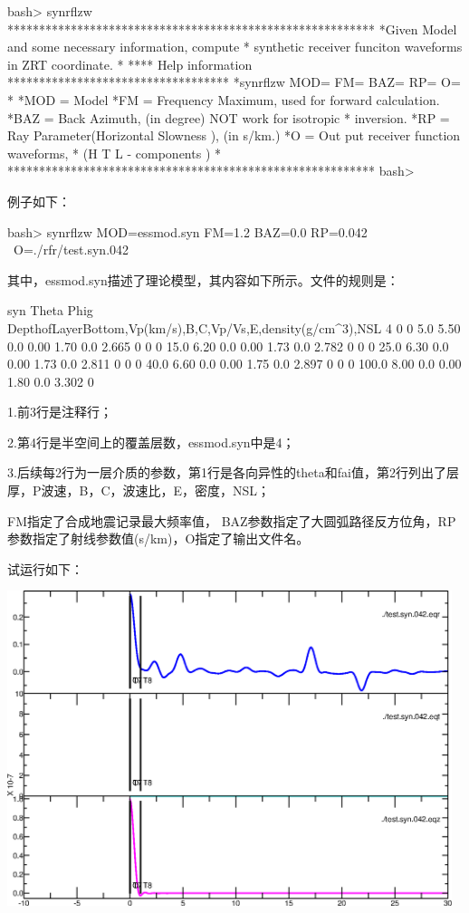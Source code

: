 \documentclass[a4paper]{article}
\begin{document}
\begin{bashCode}
bash> synrflzw
**********************************************************
*Given Model and some necessary information, compute 
* synthetic receiver funciton waveforms in ZRT coordinate.
*
**** Help information  ***********************************
*synrflzw MOD= FM= BAZ= RP= O= 	
*
*MOD = Model
*FM  = Frequency Maximum, used for forward calculation.
*BAZ = Back Azimuth, (in degree) NOT work for isotropic
*      inversion. 	
*RP  = Ray Parameter(Horizontal Slowness ), (in s/km.)
*O   = Out put receiver function waveforms, 
*      (H T L - components )	
*
**********************************************************
bash>
\end{bashCode}
例子如下：\par
\begin{bashCode}
bash> synrflzw MOD=essmod.syn FM=1.2 BAZ=0.0 RP=0.042 \
      O=./rfr/test.syn.042
\end{bashCode}
其中，essmod.syn描述了理论模型，其内容如下所示。文件的规则是：\par
\begin{fileCode}
syn
Theta Phig
DepthofLayerBottom,Vp(km/s),B,C,Vp/Vs,E,density(g/cm^3),NSL
4
0 0
5.0	5.50	0.0	0.00	1.70	0.0	2.665	0
0 0
15.0    6.20    0.0     0.00    1.73    0.0    	2.782   0
0 0
25.0    6.30    0.0     0.00    1.73    0.0     2.811   0
0 0
40.0    6.60    0.0     0.00    1.75    0.0    	2.897   0
0 0
100.0	8.00	0.0	0.00	1.80	0.0	3.302	0
\end{fileCode}
\par
1.前3行是注释行；\par
2.第4行是半空间上的覆盖层数，essmod.syn中是4；\par
3.后续每2行为一层介质的参数，第1行是各向异性的theta和fai值，第2行列出了层厚，P波速，B，C，波速比，E，密度，NSL；\par
FM指定了合成地震记录最大频率值， BAZ参数指定了大圆弧路径反方位角，RP参数指定了射线参数值(s/km)，O指定了输出文件名。\par
试运行如下：\par
\includegraphics[width=13cm]{wave.eps}
\end{document}

